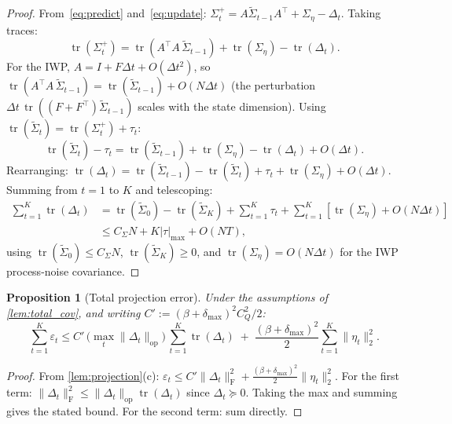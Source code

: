 \documentclass{article}
\theoremstyle{plain}
\newtheorem{proposition}[theorem]{Proposition}
\theoremstyle{definition}
\theoremstyle{remark}
\DeclareMathOperator{\tr}{tr}
\newcommand{\norm}[1]{\lVert #1 \rVert}
\newcommand{\fnorm}[1]{\lVert #1 \rVert_{\mathrm{F}}}
\newcommand{\opnorm}[1]{\lVert #1 \rVert_{\mathrm{op}}}
\begin{document}
\begin{proof}
From~\eqref{eq:predict} and~\eqref{eq:update}: $\Sigma_t^+ = A\widetilde{\Sigma}_{t-1}A^\top + \Sigma_\eta - \Delta_t$. Taking traces:
\[
\tr(\Sigma_t^+) = \tr(A^\top A\,\widetilde{\Sigma}_{t-1}) + \tr(\Sigma_\eta) - \tr(\Delta_t).
\]
For the IWP, $A = I + F\Delta t + O(\Delta t^2)$, so $\tr(A^\top A\,\widetilde{\Sigma}_{t-1}) = \tr(\widetilde{\Sigma}_{t-1}) + O(N \Delta t)$ (the perturbation $\Delta t\,\tr((F+F^\top)\widetilde{\Sigma}_{t-1})$ scales with the state dimension). Using $\tr(\widetilde{\Sigma}_t) = \tr(\Sigma_t^+) + \tau_t$:
\begin{equation}\label{eq:trace_recursion}
\tr(\widetilde{\Sigma}_t) - \tau_t = \tr(\widetilde{\Sigma}_{t-1}) + \tr(\Sigma_\eta) - \tr(\Delta_t) + O(\Delta t).
\end{equation}
Rearranging: $\tr(\Delta_t) = \tr(\widetilde{\Sigma}_{t-1}) - \tr(\widetilde{\Sigma}_t) + \tau_t + \tr(\Sigma_\eta) + O(\Delta t)$. Summing from $t = 1$ to $K$ and telescoping:
\begin{align}
\sum_{t=1}^K \tr(\Delta_t) &= \tr(\widetilde{\Sigma}_0) - \tr(\widetilde{\Sigma}_K) + \sum_{t=1}^K \tau_t + \sum_{t=1}^K[\tr(\Sigma_\eta) + O(N\Delta t)] \nonumber\\
&\leq C_\Sigma N + K|\tau|_{\max} + O(N T), \label{eq:telescoped}
\end{align}
using $\tr(\widetilde{\Sigma}_0) \leq C_\Sigma N$, $\tr(\widetilde{\Sigma}_K) \geq 0$, and $\tr(\Sigma_\eta) = O(N\Delta t)$ for the IWP process-noise covariance.
\end{proof}

\begin{proposition}[Total projection error]
\label{prop:total}
Under the assumptions of \cref{lem:total_cov}, and writing $C' := (\beta+\delta_{\max})^2 C_Q^2/2$:
\begin{equation}\label{eq:total_proj}
\sum_{t=1}^K \varepsilon_t \leq C'\,\bigl(\max_t \opnorm{\Delta_t}\bigr)\,\sum_{t=1}^K\tr(\Delta_t) \;+\; \frac{(\beta+\delta_{\max})^2}{2}\sum_{t=1}^K\norm{\eta_t}_2^2.
\end{equation}
\end{proposition}

\begin{proof}
From \cref{lem:projection}(c): $\varepsilon_t \leq C'\fnorm{\Delta_t}^2 + \frac{(\beta+\delta_{\max})^2}{2}\norm{\eta_t}_2^2$. For the first term: $\fnorm{\Delta_t}^2 \leq \opnorm{\Delta_t}\tr(\Delta_t)$ since $\Delta_t \succeq 0$. Taking the max and summing gives the stated bound. For the second term: sum directly.
\end{proof}
\end{document}
